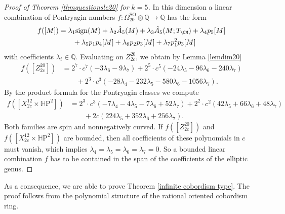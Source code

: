 \documentclass[10pt,a4paper]{amsart}
\theoremstyle{thm}
\theoremstyle{text}
\begin{document}
\begin{proof}[Proof of Theorem \ref{thmquestionsle20} for $k=5$]
In this dimension a linear combination of Pontryagin numbers $f: \Omega_{20}^{\textrm{SO}} \otimes {\mathbb{Q}} \rightarrow {\mathbb{Q}}$ has the form 
\begin{align*} f([M])&= \lambda_1 \textrm{sign}(M) + \lambda_2 \hat{A}_5(M) + \lambda_3  \hat{A}_5(M;T_\CM)+ \lambda_4 p_5[M] \\& \qquad+ \lambda_5 p_1p_4[M]+\lambda_6 p_2 p_3[M] + \lambda_7 p_1^2 p_3[M]
\end{align*}
with coefficients $\lambda_i\in  {\mathbb{Q}}$. Evaluating on $Z^{20}_{2c}$, we obtain by Lemma \ref{lemdim20}
\begin{align*}f([Z^{20}_{2c}])&=2^7 \cdot c^7 (-3 \lambda _6-9 \lambda _7)+ 2^5 \cdot c^5 (-24 \lambda _5-96 \lambda _6-240 \lambda _7)\\&\qquad+ 2^3 \cdot c^3 (-28 \lambda _4-232 \lambda _5-580 \lambda _6-1056 \lambda _7).\end{align*}
By the product formula for the Pontryagin classes we compute 
\begin{align*}f([X^{12}_{2c} \times {\mathbb{H}\mathrm{P}}^2])&=2^3 \cdot c^3 (-7 \lambda _4-4 \lambda _5-7 \lambda _6+52 \lambda _7)+2^2 \cdot c^2 (42 \lambda _5+66 \lambda _6+48 \lambda _7)\\&\qquad+ 2c (224 \lambda _5+352 \lambda _6+256 \lambda _7).\end{align*}
Both families are spin and nonnegatively curved. If $f([Z^{20}_{2c}])$ and $f([X^{12}_{2c} \times {\mathbb{H}\mathrm{P}}^2])$ are bounded, then all coefficients of these polynomials in $c$ must vanish, which implies $\lambda_4=\lambda_5=\lambda_6=\lambda_7=0$. So a bounded linear combination $f$ has to be contained in the span of the coefficients of the elliptic genus.\end{proof}

As a consequence, we are able to prove Theorem \ref{infinite cobordism type}. The proof follows from the polynomial structure of the rational oriented cobordism ring.
\end{document}
